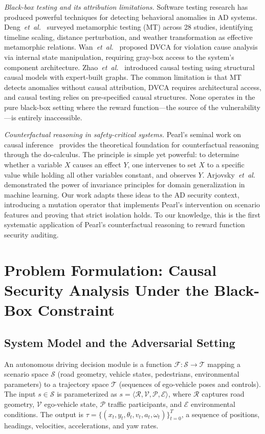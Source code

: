 \documentclass[journal]{IEEEtran}
\theoremstyle{plain}
\newcommand{\sys}{\mathcal{F}}
\begin{document}
\emph{Black-box testing and its attribution limitations.} Software testing research has produced powerful techniques for detecting behavioral anomalies in AD systems. Deng~\emph{et~al.}~\cite{deng2023rmt} surveyed metamorphic testing (MT) across 28 studies, identifying timeline scaling, distance perturbation, and weather transformation as effective metamorphic relations. Wan~\emph{et~al.}~\cite{wan2024dvca} proposed DVCA for violation cause analysis via internal state manipulation, requiring gray-box access to the system's component architecture. Zhao~\emph{et~al.}~\cite{zhao2023causal} introduced causal testing using structural causal models with expert-built graphs. The common limitation is that MT detects anomalies without causal attribution, DVCA requires architectural access, and causal testing relies on pre-specified causal structures. None operates in the pure black-box setting where the reward function---the source of the vulnerability---is entirely inaccessible.

\emph{Counterfactual reasoning in safety-critical systems.} Pearl's seminal work on causal inference~\cite{pearl2019probabilistic} provides the theoretical foundation for counterfactual reasoning through the do-calculus. The principle is simple yet powerful: to determine whether a variable $X$ causes an effect $Y$, one intervenes to set $X$ to a specific value while holding all other variables constant, and observes $Y$. Arjovsky~\emph{et~al.}~\cite{arjovsky2019invariant} demonstrated the power of invariance principles for domain generalization in machine learning. Our work adapts these ideas to the AD security context, introducing a mutation operator that implements Pearl's intervention on scenario features and proving that strict isolation holds. To our knowledge, this is the first systematic application of Pearl's counterfactual reasoning to reward function security auditing.

\section{Problem Formulation: Causal Security Analysis Under the Black-Box Constraint}

\subsection{System Model and the Adversarial Setting}

An autonomous driving decision module is a function $\sys: \mathcal{S} \to \mathcal{T}$ mapping a scenario space $\mathcal{S}$ (road geometry, vehicle states, pedestrians, environmental parameters) to a trajectory space $\mathcal{T}$ (sequences of ego-vehicle poses and controls). The input $s \in \mathcal{S}$ is parameterized as $s = \langle \mathcal{R}, \mathcal{V}, \mathcal{P}, \mathcal{E} \rangle$, where $\mathcal{R}$ captures road geometry, $\mathcal{V}$ ego-vehicle state, $\mathcal{P}$ traffic participants, and $\mathcal{E}$ environmental conditions. The output is $\tau = \{(x_t,y_t,\theta_t,v_t,a_t,\omega_t)\}_{t=0}^T$, a sequence of positions, headings, velocities, accelerations, and yaw rates.
\end{document}
